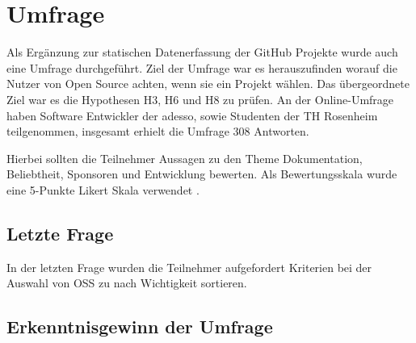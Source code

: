 \chapter{Umfrage}

Als Ergänzung zur statischen Datenerfassung der GitHub Projekte wurde auch eine Umfrage durchgeführt.
Ziel der Umfrage war es herauszufinden worauf die Nutzer von Open Source achten, wenn sie ein Projekt
wählen. Das übergeordnete Ziel war es die Hypothesen H3, H6 und H8 zu prüfen.
An der Online-Umfrage haben Software Entwickler der adesso, sowie Studenten der TH Rosenheim teilgenommen,
insgesamt erhielt die Umfrage 308 Antworten.

Hierbei sollten die Teilnehmer Aussagen zu den Theme Dokumentation, Beliebtheit, Sponsoren und
Entwicklung bewerten. Als Bewertungsskala wurde eine 5-Punkte Likert Skala verwendet \cite{likertScale}.






%

%

%


\newpage %
\cleardoubleemptypage
\section{Letzte Frage}


In der letzten Frage wurden die Teilnehmer aufgefordert Kriterien bei der Auswahl von OSS zu nach
Wichtigkeit sortieren.

\section{Erkenntnisgewinn der Umfrage}
